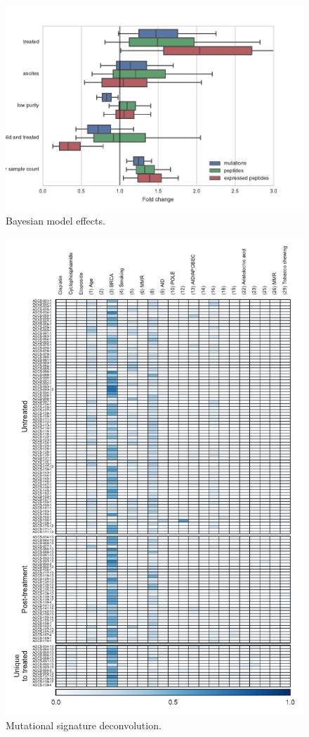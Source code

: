 \begin{figure}
\centering
\includegraphics[scale=1.2]{figures/bayesian_model_effects.pdf}
\caption{Bayesian model effects. }
\label{fig:bayesian}
\end{figure}

\begin{figure}
\centering
\includegraphics[scale=1.2]{figures/signatures.pdf}
\caption{Mutational signature deconvolution. }
\label{fig:signature}
\end{figure}




